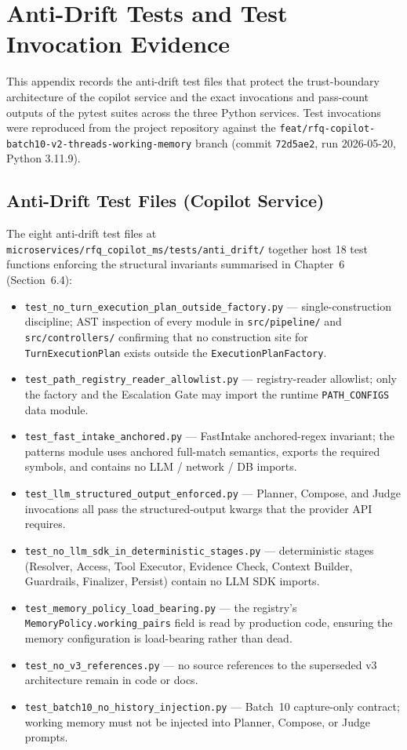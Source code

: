\section{Anti-Drift Tests and Test Invocation Evidence}
\label{app:test-evidence}

This appendix records the anti-drift test files that protect the trust-boundary architecture of the copilot service and the exact invocations and pass-count outputs of the pytest suites across the three Python services. Test invocations were reproduced from the project repository against the \texttt{feat/rfq-copilot-batch10-v2-threads-working-memory} branch (commit \texttt{72d5ae2}, run 2026-05-20, Python 3.11.9).

\subsection{Anti-Drift Test Files (Copilot Service)}

The eight anti-drift test files at \texttt{microservices/rfq\_copilot\_ms/tests/anti\_drift/} together host 18 test functions enforcing the structural invariants summarised in Chapter~6 (Section~6.4):

\begin{itemize}\setlength\itemsep{0.2em}
\item \texttt{test\_no\_turn\_execution\_plan\_outside\_factory.py} --- single-construction discipline; AST inspection of every module in \texttt{src/pipeline/} and \texttt{src/controllers/} confirming that no construction site for \texttt{TurnExecutionPlan} exists outside the \texttt{ExecutionPlanFactory}.
\item \texttt{test\_path\_registry\_reader\_allowlist.py} --- registry-reader allowlist; only the factory and the Escalation Gate may import the runtime \texttt{PATH\_CONFIGS} data module.
\item \texttt{test\_fast\_intake\_anchored.py} --- FastIntake anchored-regex invariant; the patterns module uses anchored full-match semantics, exports the required symbols, and contains no LLM / network / DB imports.
\item \texttt{test\_llm\_structured\_output\_enforced.py} --- Planner, Compose, and Judge invocations all pass the structured-output kwargs that the provider API requires.
\item \texttt{test\_no\_llm\_sdk\_in\_deterministic\_stages.py} --- deterministic stages (Resolver, Access, Tool Executor, Evidence Check, Context Builder, Guardrails, Finalizer, Persist) contain no LLM SDK imports.
\item \texttt{test\_memory\_policy\_load\_bearing.py} --- the registry's \texttt{MemoryPolicy.working\_pairs} field is read by production code, ensuring the memory configuration is load-bearing rather than dead.
\item \texttt{test\_no\_v3\_references.py} --- no source references to the superseded v3 architecture remain in code or docs.
\item \texttt{test\_batch10\_no\_history\_injection.py} --- Batch~10 capture-only contract; working memory must not be injected into Planner, Compose, or Judge prompts.
\end{itemize}

